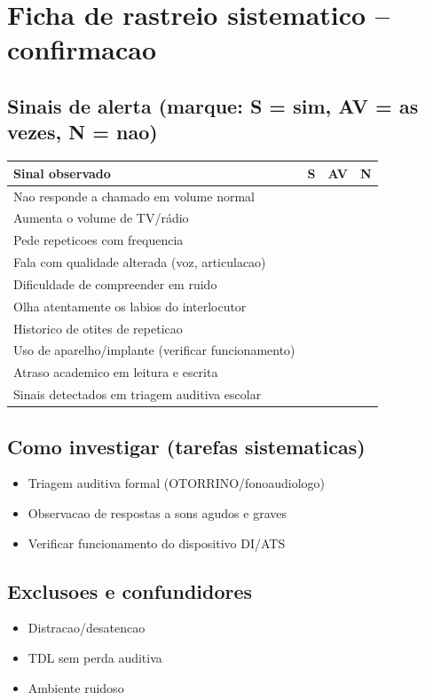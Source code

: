 \documentclass[a4paper,11pt]{book}
\begin{document}
\section*{Ficha de rastreio sistematico -- confirmacao}
\subsection*{Sinais de alerta (marque: S = sim, AV = as vezes, N = nao)}
\begin{tabular}{@{}p{11.5cm}ccc@{}}\toprule
Sinal observado & S & AV & N \\\midrule
Nao responde a chamado em volume normal & & & \\
Aumenta o volume de TV/rádio & & & \\
Pede repeticoes com frequencia & & & \\
Fala com qualidade alterada (voz, articulacao) & & & \\
Dificuldade de compreender em ruido & & & \\
Olha atentamente os labios do interlocutor & & & \\
Historico de otites de repeticao & & & \\
Uso de aparelho/implante (verificar funcionamento) & & & \\
Atraso academico em leitura e escrita & & & \\
Sinais detectados em triagem auditiva escolar & & & \\
\bottomrule\end{tabular}
\subsection*{Como investigar (tarefas sistematicas)}
\begin{itemize}
\item Triagem auditiva formal (OTORRINO/fonoaudiologo)
\item Observacao de respostas a sons agudos e graves
\item Verificar funcionamento do dispositivo DI/ATS
\end{itemize}
\subsection*{Exclusoes e confundidores}
\begin{itemize}
\item Distracao/desatencao
\item TDL sem perda auditiva
\item Ambiente ruidoso
\end{itemize}
\end{document}
